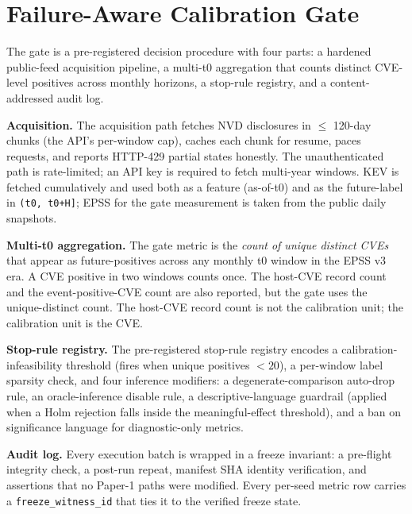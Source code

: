 \section{Failure-Aware Calibration Gate}
The gate is a pre-registered decision procedure with four parts: a hardened public-feed acquisition pipeline, a multi-t0 aggregation that counts distinct CVE-level positives across monthly horizons, a stop-rule registry, and a content-addressed audit log.

\textbf{Acquisition.} The acquisition path fetches NVD disclosures in $\leq$ 120-day chunks (the API's per-window cap), caches each chunk for resume, paces requests, and reports HTTP-429 partial states honestly. The unauthenticated path is rate-limited; an API key is required to fetch multi-year windows. KEV is fetched cumulatively and used both as a feature (as-of-t0) and as the future-label in \texttt{(t0, t0+H]}; EPSS for the gate measurement is taken from the public daily snapshots.

\textbf{Multi-t0 aggregation.} The gate metric is the \emph{count of unique distinct CVEs} that appear as future-positives across any monthly t0 window in the EPSS v3 era. A CVE positive in two windows counts once. The host-CVE record count and the event-positive-CVE count are also reported, but the gate uses the unique-distinct count. The host-CVE record count is not the calibration unit; the calibration unit is the CVE.

\textbf{Stop-rule registry.} The pre-registered stop-rule registry encodes a calibration-infeasibility threshold (fires when unique positives $< 20$), a per-window label sparsity check, and four inference modifiers: a degenerate-comparison auto-drop rule, an oracle-inference disable rule, a descriptive-language guardrail (applied when a Holm rejection falls inside the meaningful-effect threshold), and a ban on significance language for diagnostic-only metrics.

\textbf{Audit log.} Every execution batch is wrapped in a freeze invariant: a pre-flight integrity check, a post-run repeat, manifest SHA identity verification, and assertions that no Paper-1 paths were modified. Every per-seed metric row carries a \texttt{freeze\_witness\_id} that ties it to the verified freeze state.
